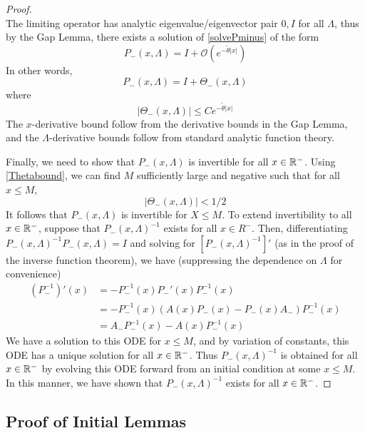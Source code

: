 \documentclass[thesis.tex]{subfiles}
\begin{document}
\begin{lemma}
\begin{proof}
\[\]
The limiting operator has analytic eigenvalue/eigenvector pair $0, I$ for all $\Lambda$, thus by the Gap Lemma, there exists a solution of \eqref{solvePminus} of the form 
\begin{equation*}
P_-(x, \Lambda) = I + \mathcal{O}(e^{-\tilde{\theta}|x|})
\end{equation*}
In other words, 
\begin{equation*}
P_-(x, \Lambda) = I + \Theta_-(x, \Lambda)
\end{equation*}
where 
\begin{equation}\label{Thetabound}
|\Theta_-(x, \Lambda)| \leq C e^{-\tilde{\theta}|x|}
\end{equation}
The $x$-derivative bound follow from the derivative bounds in the Gap Lemma, and the $\Lambda$-derivative bounds follow from standard analytic function theory.

Finally, we need to show that $P_-(x, \Lambda)$ is invertible for all $x \in {\mathbb R}^-$. Using \eqref{Thetabound}, we can find $M$ sufficiently large and negative such that for all $x \leq M$,
\[
|\Theta_-(x, \Lambda)| < 1/2
\]
It follows that $P_-(x, \Lambda)$ is invertible for $X \leq M$. To extend invertibility to all $x \in {\mathbb R}^-$, suppose that $P_-(x, \Lambda)^{-1}$ exists for all $x \in R^-$. Then, differentiating $P_-(x, \Lambda)^{-1} P_-(x, \Lambda) = I$ and solving for $[P_-(x, \Lambda)^{-1}]'$ (as in the proof of the inverse function theorem), we have (suppressing the dependence on $\Lambda$ for convenience)
\begin{align*}
(P_-^{-1})'(x) &= -P_-^{-1}(x)P_-'(x)P_-^{-1}(x) \\
&= -P_-^{-1}(x)( A(x)P_-(x) - P_-(x) A_-)P_-^{-1}(x) \\
&= A_- P_-^{-1}(x) - A(x) P_-^{-1}(x)
\end{align*}
We have a solution to this ODE for $x \leq M$, and by variation of constants, this ODE has a unique solution for all $x \in {\mathbb R}^-$. Thus $P_-(x, \Lambda)^{-1}$ is obtained for all $x \in {\mathbb R}^-$ by evolving this ODE forward from an initial condition at some $x \leq M$. In this manner, we have shown that $P_-(x, \Lambda)^{-1}$ exists for all $x \in {\mathbb R}^-$.
\end{proof}
\end{lemma}

\subsection{Proof of Initial Lemmas}
\end{document}
